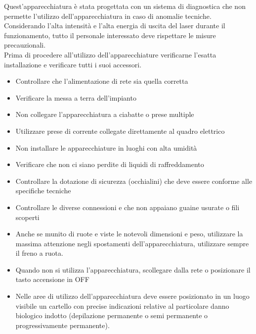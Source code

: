\documentclass[10pt]{article}
\begin{document}
Quest'apparecchiatura è stata progettata con un sistema di diagnostica che non permette l'utilizzo dell'apparecchiatura in caso di anomalie tecniche.\\
Considerando l'alta intensità e l'alta energia di uscita del laser durante il funzionamento, tutto il personale interessato deve rispettare le misure precauzionali.\\
Prima di procedere all'utilizzo dell'apparecchiature verificarne l'esatta installazione e verificare tutti i suoi accessori.

\begin{itemize}
  \item Controllare che l'alimentazione di rete sia quella corretta
  \item Verificare la messa a terra dell'impianto
  \item Non collegare l'apparecchiatura a ciabatte o prese multiple
  \item Utilizzare prese di corrente collegate direttamente al quadro elettrico
  \item Non installare le apparecchiature in luoghi con alta umidità
  \item Verificare che non ci siano perdite di liquidi di raffreddamento
  \item Controllare la dotazione di sicurezza (occhialini) che deve essere conforme alle specifiche tecniche
  \item Controllare le diverse connessioni e che non appaiano guaine usurate o fili scoperti
  \item Anche se munito di ruote e viste le notevoli dimensioni e peso, utilizzare la massima attenzione negli spostamenti dell'apparecchiatura, utilizzare sempre il freno a ruota.
  \item Quando non si utilizza l'apparecchiatura, scollegare dalla rete o posizionare il tasto accensione in OFF
  \item Nelle aree di utilizzo dell'apparecchiatura deve essere posizionato in un luogo visibile un cartello con precise indicazioni relative al particolare danno biologico indotto (depilazione permanente o semi permanente o progressivamente permanente).
\end{itemize}
\end{document}
